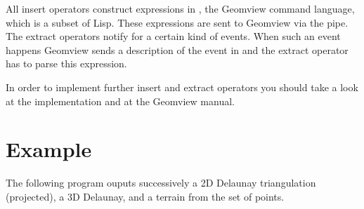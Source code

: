All insert operators construct expressions in , the Geomview
command language, which is a subset of {\sc Lisp}. These expressions
are sent to Geomview via the pipe. The extract operators notify 
for a certain kind of events. When such an event happens Geomview
sends a description of the event in  and the extract operator has
to parse this expression.

In order to implement further insert and extract operators you should
take a look at the implementation and at the Geomview manual.


\section{Example}
The following program ouputs successively a 2D
Delaunay triangulation (projected), a 3D Delaunay, and a terrain
from the set of points.
